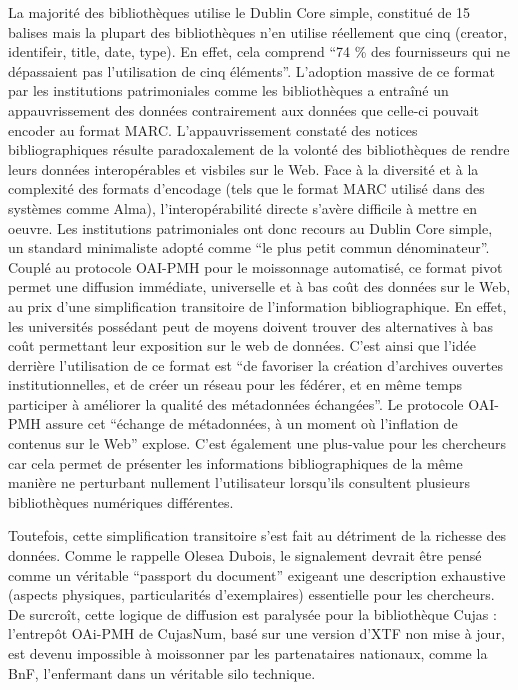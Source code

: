 La majorité des bibliothèques utilise le Dublin Core simple, constitué de 15 balises mais la plupart des bibliothèques n'en utilise réellement que cinq (creator, identifeir, title, date, type). En effet, cela comprend \enquote{74 \% des fournisseurs qui ne dépassaient pas l'utilisation de cinq éléments}. L'adoption massive de ce format par les institutions patrimoniales comme les bibliothèques a entraîné un appauvrissement des données contrairement aux données que celle-ci pouvait encoder au format MARC. L'appauvrissement constaté des notices bibliographiques résulte paradoxalement de la volonté des bibliothèques de rendre leurs données interopérables et visbiles sur le Web. Face à la diversité et à la complexité des formats d'encodage (tels que le format MARC utilisé dans des systèmes comme Alma), l'interopérabilité directe s'avère difficile à mettre en oeuvre. Les institutions patrimoniales ont donc recours au Dublin Core simple, un standard minimaliste adopté comme \enquote{le plus petit commun dénominateur}. Couplé au protocole OAI-PMH pour le moissonnage automatisé, ce format pivot permet une diffusion immédiate, universelle et à bas coût des données sur le Web, au prix d'une simplification transitoire de l'information bibliographique. En effet, les universités possédant peut de moyens doivent trouver des alternatives à bas coût permettant leur exposition sur le web de données. C'est ainsi que l'idée derrière l'utilisation de ce format est \enquote{de favoriser la création d'archives ouvertes institutionnelles, et de créer un réseau pour les fédérer, et en même temps participer à améliorer la qualité des métadonnées échangées}. Le protocole OAI-PMH assure cet \enquote{échange de métadonnées, à un moment où l'inflation de contenus sur le Web} explose. C'est également une plus-value pour les chercheurs car cela permet de présenter les informations bibliographiques de la même manière ne perturbant nullement l'utilisateur lorsqu'ils consultent plusieurs bibliothèques numériques différentes. 

Toutefois, cette simplification transitoire s'est fait au détriment de la richesse des données. Comme le rappelle Olesea Dubois, le signalement devrait être pensé comme un véritable \enquote{passport du document} exigeant une description exhaustive (aspects physiques, particularités d'exemplaires) essentielle pour les chercheurs. De surcroît, cette logique de diffusion est paralysée pour la bibliothèque Cujas : l'entrepôt OAi-PMH de CujasNum, basé sur une version d'XTF non mise à jour, est devenu impossible à moissonner par les partenataires nationaux, comme la BnF, l'enfermant dans un véritable silo technique. 

